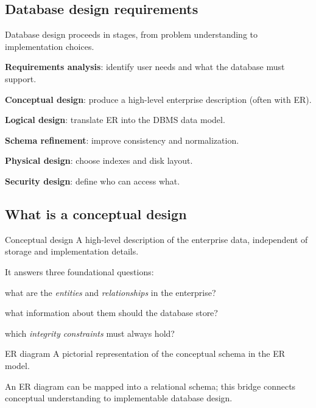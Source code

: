 \documentclass[../../dis.tex]{subfiles}
\begin{document}
\subsection{Database design requirements}
Database design proceeds in stages, from problem understanding to implementation choices.

\begin{dashlist}
    \item \textbf{Requirements analysis}: identify user needs and what the database must support.
    \item \textbf{Conceptual design}: produce a high-level enterprise description (often with ER).
    \item \textbf{Logical design}: translate ER into the DBMS data model.
    \item \textbf{Schema refinement}: improve consistency and normalization.
    \item \textbf{Physical design}: choose indexes and disk layout.
    \item \textbf{Security design}: define who can access what.
\end{dashlist}

\subsection{What is a conceptual design}
\begin{concept}{Conceptual design}
A high-level description of the enterprise data, independent of storage and implementation details.
\end{concept}

It answers three foundational questions:

\begin{dashlist}
    \item what are the \emph{entities} and \emph{relationships} in the enterprise?
    \item what information about them should the database store?
    \item which \emph{integrity constraints} must always hold?
\end{dashlist}

\begin{concept}{ER diagram}
A pictorial representation of the conceptual schema in the ER model.
\end{concept}

An ER diagram can be mapped into a relational schema; this bridge connects conceptual understanding to implementable database design.
\end{document}
